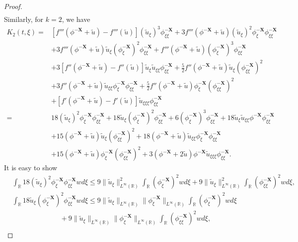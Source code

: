 \documentclass[10pt,reqno]{amsart}
\numberwithin{equation}{section}
\begin{document}
\begin{proof}
\begin{align*}
		\end{align*}
		Similarly, for $k=2$, we have
		\begin{align*}
			K_2(t,\xi)=&\left[f'''(\phi^{-\mathbf{X}}+\tilde{u})-f'''(\tilde{u})\right](\tilde{u}_{\xi})^3\phi^{-\mathbf{X}}_{\xi\xi}+3f'''(\phi^{-\mathbf{X}}+\tilde{u})(\tilde{u}_{\xi})^{2}\phi_{\xi}^{-\mathbf{X}}\phi_{\xi\xi}^{-\mathbf{X}}
			\\
			&+3f'''(\phi^{-\mathbf{X}}+\tilde{u})\tilde{u}_{\xi}(\phi_{\xi}^{-\mathbf{X}})^{2}\phi_{\xi\xi}^{-\mathbf{X}}+f'''(\phi^{-\mathbf{X}}+\tilde{u})(\phi_{\xi}^{-\mathbf{X}})^{3}\phi_{\xi\xi}^{-\mathbf{X}}\\
			&+3[f''(\phi^{-\mathbf{X}}+\tilde{u})-f''(\tilde{u})]\tilde{u}_{\xi}\tilde{u}_{\xi\xi}\phi_{\xi\xi}^{-\mathbf{X}}+\frac{5}{2}f''(\phi^{-\mathbf{X}}+\tilde{u})\tilde{u}_{\xi}(\phi_{\xi\xi}^{-\mathbf{X}})^{2}\\
			&+3f''(\phi^{-\mathbf{X}}+\tilde{u})\tilde{u}_{\xi\xi}\phi_{\xi}^{-\mathbf{X}}\phi_{\xi\xi}^{-\mathbf{X}}+\frac{5}{2}f''(\phi^{-\mathbf{X}}+\tilde{u})\phi_{\xi}^{-\mathbf{X}}(\phi_{\xi\xi}^{-\mathbf{X}})^{2}\\
			&+[f'(\phi^{-\mathbf{X}}+\tilde{u})-f'(\tilde{u})]\tilde{u}_{\xi\xi\xi}\phi_{\xi\xi}^{-\mathbf{X}}\\
			=&18(\tilde{u}_{\xi})^{2}\phi_{\xi}^{-\mathbf{X}}\phi_{\xi\xi}^{-\mathbf{X}}+18\tilde{u}_{\xi}(\phi_{\xi}^{-\mathbf{X}})^{2}\phi_{\xi\xi}^{-\mathbf{X}}+6(\phi_{\xi}^{-\mathbf{X}})^{3}\phi_{\xi\xi}^{-\mathbf{X}}+18\tilde{u}_{\xi}\tilde{u}_{\xi\xi}\phi^{-\mathbf{X}}\phi_{\xi\xi}^{-\mathbf{X}}\\
			&+15(\phi^{-\mathbf{X}}+\tilde{u})\tilde{u}_{\xi}(\phi_{\xi\xi}^{-\mathbf{X}})^{2}+18(\phi^{-\mathbf{X}}+\tilde{u})\tilde{u}_{\xi\xi}\phi_{\xi}^{-\mathbf{X}}\phi_{\xi\xi}^{-\mathbf{X}}\\
			&+15(\phi^{-\mathbf{X}}+\tilde{u})\phi_{\xi}^{-\mathbf{X}}(\phi_{\xi\xi}^{-\mathbf{X}})^{2}+3(\phi^{-\mathbf{X}}+2\tilde{u})\phi^{-\mathbf{X}}\tilde{u}_{\xi\xi\xi}\phi_{\xi\xi}^{-\mathbf{X}}.
		\end{align*}
		It is easy to show
		\begin{align*}
			&\int_{\mathbb{R}}18(\tilde{u}_{\xi})^{2}\phi_{\xi}^{-\mathbf{X}}\phi_{\xi\xi}^{-\mathbf{X}}wd\xi\leq 9\|\tilde{u}_{\xi}\|_{L^{\infty}(\mathbb{R})}^2\int_{\mathbb{R}}(\phi_{\xi}^{-\mathbf{X}})^2wd\xi+9\|\tilde{u}_{\xi}\|_{L^{\infty}(\mathbb{R})}^2\int_{\mathbb{R}}(\phi_{\xi\xi}^{-\mathbf{X}})^2wd\xi,\\
			&\int_{\mathbb{R}}18\tilde{u}_{\xi}(\phi_{\xi}^{-\mathbf{X}})^{2}\phi_{\xi\xi}^{-\mathbf{X}}wd\xi\leq 9\|\tilde{u}_{\xi}\|_{L^{\infty}(\mathbb{R})}\|\phi^{-\mathbf{X}}_{\xi}\|_{L^{\infty}(\mathbb{R})}\int_{\mathbb{R}}(\phi_{\xi}^{-\mathbf{X}})^2wd\xi\\&\ \ \ \ \ \ \ \ \ \ \ \ \ \ \ \ \ \ \ \ \ \ \ \ \ \ \ \ \ \ \ +9\|\tilde{u}_{\xi}\|_{L^{\infty}(\mathbb{R})}\|\phi^{-\mathbf{X}}_{\xi}\|_{L^{\infty}(\mathbb{R})}\int_{\mathbb{R}}(\phi_{\xi\xi}^{-\mathbf{X}})^2wd\xi,\\

\end{align*}
\end{proof}
\end{document}
